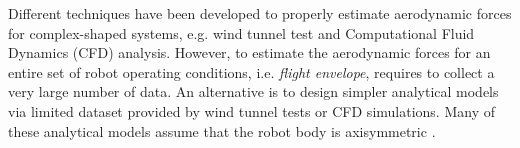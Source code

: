 Different techniques have been developed to properly estimate aerodynamic forces for complex-shaped systems, e.g. wind tunnel test and Computational Fluid Dynamics (CFD) analysis. However, to estimate the aerodynamic forces for an entire set of robot operating conditions, i.e. \emph{flight envelope}, requires to collect a very large number of data. An alternative is to design simpler analytical models via limited dataset provided by wind tunnel tests or CFD simulations. Many of these analytical models assume that the robot body is axisymmetric \cite{c3}\cite{c23}\cite{c25}.  %




